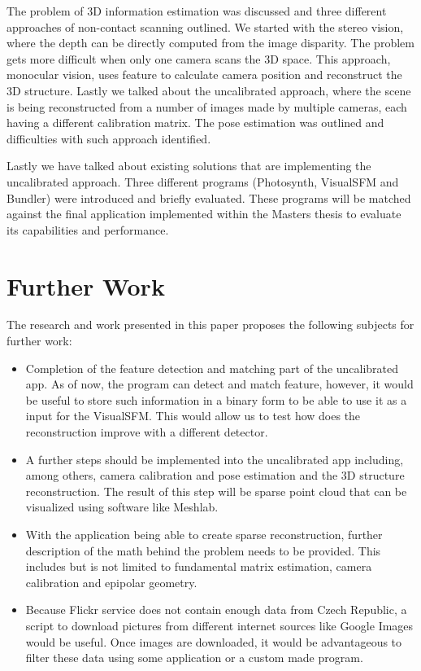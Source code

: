 The problem of 3D information estimation was discussed and three different approaches of non-contact scanning outlined. We started with the stereo vision, where the depth can be directly computed from the image disparity. The problem gets more difficult when only one camera scans the 3D space. This approach, monocular vision, uses feature to calculate camera position and reconstruct the 3D structure. Lastly we talked about the uncalibrated approach, where the scene is being reconstructed from a number of images made by multiple cameras, each having a different calibration matrix. The pose estimation was outlined and difficulties with such approach identified.

Lastly we have talked about existing solutions that are implementing the uncalibrated approach. Three different programs (Photosynth, VisualSFM and Bundler) were introduced and briefly evaluated. These programs will be matched against the final application implemented within the Masters thesis to evaluate its capabilities and performance.

\section{Further Work}
The research and work presented in this paper proposes the following subjects for further work:
\begin{itemize}
	\item Completion of the feature detection and matching part of the uncalibrated app. As of now, the program can detect and match feature, however, it would be useful to store such information in a binary form to be able to use it as a input for the VisualSFM. This would allow us to test how does the reconstruction improve with a different detector.
	
	\item A further steps should be implemented into the uncalibrated app including, among others, camera calibration and pose estimation and the 3D structure reconstruction. The result of this step will be sparse point cloud that can be visualized using software like Meshlab.
	
	\item With the application being able to create sparse reconstruction, further description of the math behind the problem needs to be provided. This includes but is not limited to fundamental matrix estimation, camera calibration and epipolar geometry.
	
	\item Because Flickr service does not contain enough data from Czech Republic, a script to download pictures from different internet sources like Google Images would be useful. Once images are downloaded, it would be advantageous to filter these data using some application or a custom made program.
\end{itemize}
